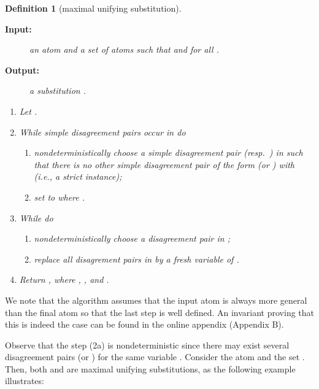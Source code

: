 \documentclass[fleqn]{tlp}
\newtheorem{definition}{Definition} \newtheorem{example}{Example} \newtheorem{lemma}{Lemma} \newtheorem{proposition}{Proposition} \newtheorem{theorem}{Theorem} \newtheorem{corollary}{Corollary}
\begin{document}
\begin{definition}[maximal unifying substitution] \label{alg1}
\begin{description}
\item[\textbf{Input:}] 
  an atom  and a set of atoms  such that
   and  for all .
\item[\textbf{Output:}] a substitution .
\end{description}

\begin{enumerate}
\item \label{algo-msa-init}
  Let .
\item \label{algo-msa-while-simple}
  While simple disagreement pairs occur in  do
  \begin{enumerate}
  \item nondeterministically choose a simple disagreement pair 
    (resp.\ ) in  such that there is no other simple
    disagreement pair of the form  (or ) with 
    (i.e., a strict instance);
  \item \label{algo-msa-simple-pair}
    set  to  where .
  \end{enumerate}
\item \label{algo-msa-while-not-simple}
  While  do
  \begin{enumerate}
  \item nondeterministically choose a 
    disagreement pair  in ;
  \item \label{algo-msa-not-simple-pair} replace all disagrement
    pairs  in  by a fresh variable of .
  \end{enumerate}
\item \label{algo-msa-return} 
  Return , where , , and .
\end{enumerate}
\end{definition}
We note that the algorithm assumes that the input atom  is always more
general than the final atom  so that the last step is well defined. 
An invariant proving that this is indeed the case can be found in the
online appendix (Appendix B).

Observe that the step (2a) is nondeterministic since there may exist
several disagreement pairs  (or ) for the same variable .
Consider the atom  and the set
. Then, both  and 
are maximal unifying substitutions, as the following example
illustrates:
\end{document}
